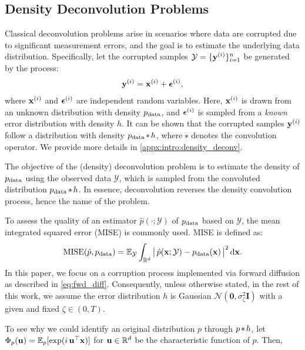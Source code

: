 \subsection{Density Deconvolution Problems}
\label{sec:prel:deconv_prob}

Classical deconvolution problems arise in scenarios where data are corrupted due to significant measurement errors, and the goal is to estimate the underlying data distribution. Specifically, let the corrupted samples $\mathcal{Y} = \{\mathbf{y}^{(i)}\}_{i=1}^{n}$ be generated by the process:
\begin{align}
	\mathbf{y}^{(i)} = \mathbf{x}^{(i)} + \boldsymbol \epsilon^{(i)}, \label{eq:gen_conv_samples}
\end{align}
where $\mathbf{x}^{(i)}$ and $\boldsymbol \epsilon^{(i)}$ are independent random variables. Here, $\mathbf{x}^{(i)}$ is drawn from an unknown distribution with density $p_{\rm data}$, and $\boldsymbol \epsilon^{(i)}$ is sampled from a \emph{known} error distribution with density $h$. It can be shown that the corrupted samples $\mathbf{y}^{(i)}$ follow a distribution with density $p_{\rm data} \hspace{-0.1em}*\hspace{-0.1em} h$, where $\hspace{-0.1em}*\hspace{-0.1em}$ denotes the convolution operator. We provide more details in \cref{appx:intro:density_deconv}.


The objective of the (density) deconvolution problem is to estimate the density of $p_{\rm data}$ using the observed data $\mathcal{Y}$, which is sampled from the convoluted distribution $p_{\rm data} \hspace{-0.1em}*\hspace{-0.1em} h$. In essence, deconvolution reverses the density convolution process, hence the name of the problem.

To assess the quality of an estimator $\hat{p}(\cdot; \mathcal{Y})$ of $p_{\rm data}$ based on $\mathcal{Y}$, the mean integrated squared error (MISE) is commonly used. MISE is defined as:
\begin{align}
	\textrm{MISE}( \hat p, p_\textrm{data}) = \mathbb{E}_{\mathcal{Y}} \int_{\mathbb{R}^d} \big|\,                                                            \hat p(\mathbf{x} ; \mathcal{Y}) - p_\textrm{data}(\mathbf{x}) \, \big|^2 \,\mathrm{d} \mathbf{x}. \label{eq:def_MISE}
\end{align}
In this paper, we focus on a corruption process implemented via forward diffusion as described in \cref{eq:fwd_diff}. Consequently, unless otherwise stated, in the rest of this work, we assume the error distribution $h$ is Gaussian $\mathcal{N}(\mathbf{0}, \sigma_\zeta^2\mathbf{I})$ with a given and fixed $\zeta \in (0, T)$.

To see why we could identify an original distribution $p$ through $p \hspace{-0.1em}*\hspace{-0.1em} h$, let $\Phi_p(\mathbf{u}) = \mathbb{E}_p[\exp(i \, \mathbf{u}^\top \mathbf{x})]$ for $\mathbf{u} \in \mathbb{R}^d$ be the characteristic function of $p$. Then,

